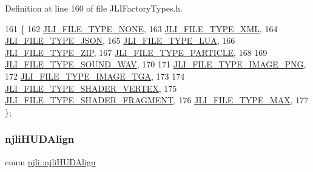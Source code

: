 Definition at line 160 of file J\+L\+I\+Factory\+Types.\+h.


\begin{DoxyCode}
161   \{
162     \mbox{\hyperlink{namespacenjli_a3699b2e13e71094f00d7f0141e131106addcfb55aa16f2679fc7f33255e300d10}{JLI\_FILE\_TYPE\_NONE}},
163     \mbox{\hyperlink{namespacenjli_a3699b2e13e71094f00d7f0141e131106a08c56908bba0862d4aaa2a41f8e3e181}{JLI\_FILE\_TYPE\_XML}},
164     \mbox{\hyperlink{namespacenjli_a3699b2e13e71094f00d7f0141e131106a1304d2a37e7bc9bdbaa82c4da90dedc9}{JLI\_FILE\_TYPE\_JSON}},
165     \mbox{\hyperlink{namespacenjli_a3699b2e13e71094f00d7f0141e131106af77f57b3b98c8d64e9314b10ca860858}{JLI\_FILE\_TYPE\_LUA}},
166     \mbox{\hyperlink{namespacenjli_a3699b2e13e71094f00d7f0141e131106a2881cacf18969fe8b4283e7f3d3bf303}{JLI\_FILE\_TYPE\_ZIP}},
167     \mbox{\hyperlink{namespacenjli_a3699b2e13e71094f00d7f0141e131106a72c8b342c078506a133751a7cdb83c67}{JLI\_FILE\_TYPE\_PARTICLE}},
168 
169     \mbox{\hyperlink{namespacenjli_a3699b2e13e71094f00d7f0141e131106a32c3ebe3a14c79fc617c710843ebd857}{JLI\_FILE\_TYPE\_SOUND\_WAV}},
170 
171     \mbox{\hyperlink{namespacenjli_a3699b2e13e71094f00d7f0141e131106a5a3690a9a85ada0c5ae89bbd779c523a}{JLI\_FILE\_TYPE\_IMAGE\_PNG}},
172     \mbox{\hyperlink{namespacenjli_a3699b2e13e71094f00d7f0141e131106acbb84d2c588f4cd07dd330a01689effe}{JLI\_FILE\_TYPE\_IMAGE\_TGA}},
173 
174     \mbox{\hyperlink{namespacenjli_a3699b2e13e71094f00d7f0141e131106a93b7f63dc05cd6b4c909308689c142c1}{JLI\_FILE\_TYPE\_SHADER\_VERTEX}},
175     \mbox{\hyperlink{namespacenjli_a3699b2e13e71094f00d7f0141e131106a8fc389ed5916535109817251145c3711}{JLI\_FILE\_TYPE\_SHADER\_FRAGMENT}},
176     \mbox{\hyperlink{namespacenjli_a3699b2e13e71094f00d7f0141e131106ace7c895ebca9587626e22e57914c9f65}{JLI\_FILE\_TYPE\_MAX}},
177   \};
\end{DoxyCode}
\mbox{\label{namespacenjli_a376c3102aef4710f2b54a545bf0e2b3a}} 
\subsubsection{\texorpdfstring{njli\+H\+U\+D\+Align}{njliHUDAlign}}
{\footnotesize\ttfamily enum \mbox{\hyperlink{namespacenjli_a376c3102aef4710f2b54a545bf0e2b3a}{njli\+::njli\+H\+U\+D\+Align}}}

